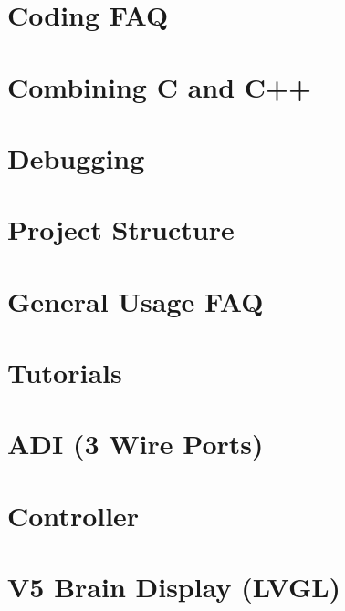 \documentclass[twoside]{book}
\newcommand{\+}{\discretionary{\mbox{\scriptsize$\hookleftarrow$}}{}{}}
\begin{document}
\chapter{Coding F\+AQ}
\label{md_docs_tutorials_general_coding-faq}

\chapter{Combining C and C++}
\label{md_docs_tutorials_general_combining-c-cpp}

\chapter{Debugging}
\label{md_docs_tutorials_general_debugging}

\chapter{Project Structure}
\label{md_docs_tutorials_general_project-structure}

\chapter{General Usage F\+AQ}
\label{md_docs_tutorials_general_usage-faq}

\chapter{Tutorials}
\label{md_docs_tutorials_index}

\chapter{A\+DI (3 Wire Ports)}
\label{md_docs_tutorials_topical_adi}

\chapter{Controller}
\label{md_docs_tutorials_topical_controller}

\chapter{V5 Brain Display (L\+V\+GL)}
\label{md_docs_tutorials_topical_display}

\end{document}
